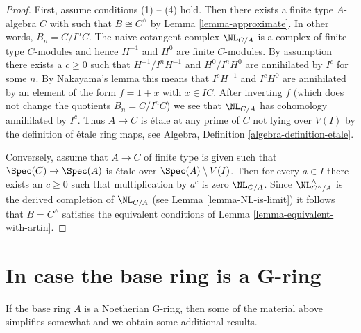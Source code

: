 \begin{proof}
First, assume conditions (1) -- (4) hold. Then there exists
a finite type $A$-algebra $C$ with such that $B \cong C^\wedge$
by Lemma \ref{lemma-approximate}. In other words, $B_n = C/I^nC$.
The naive cotangent complex $\NL_{C/A}$ is a complex of finite type
$C$-modules and hence $H^{-1}$ and $H^0$ are finite $C$-modules.
By assumption there exists a $c \geq 0$ such that
$H^{-1}/I^nH^{-1}$ and $H^0/I^nH^0$ are annihilated by $I^c$
for some $n$. By Nakayama's lemma this means that
$I^cH^{-1}$ and $I^cH^0$ are annihilated by an element of the
form $f = 1 + x$ with $x \in IC$. After inverting $f$
(which does not change the quotients $B_n = C/I^nC$)
we see that $\NL_{C/A}$ has cohomology annihilated by $I^c$. Thus
$A \to C$ is \'etale at any prime of $C$ not lying over $V(I)$
by the definition of \'etale ring maps, see
Algebra, Definition \ref{algebra-definition-etale}.

\medskip\noindent
Conversely, assume that $A \to C$ of finite type is given such that
$\Spec(C) \to \Spec(A)$ is \'etale over $\Spec(A) \setminus V(I)$.
Then for every $a \in I$ there exists an $c \geq 0$ such that
multiplication by $a^c$ is zero $\NL_{C/A}$.
Since $\NL_{C^\wedge/A}^\wedge$ is the derived completion of
$\NL_{C/A}$ (see Lemma \ref{lemma-NL-is-limit}) it follows that
$B = C^\wedge$ satisfies the equivalent conditions of
Lemma \ref{lemma-equivalent-with-artin}.
\end{proof}








\section{In case the base ring is a G-ring}
\label{section-over-G-ring}

\noindent
If the base ring $A$ is a Noetherian G-ring, then some of the material
above simplifies somewhat and we obtain some additional results.

